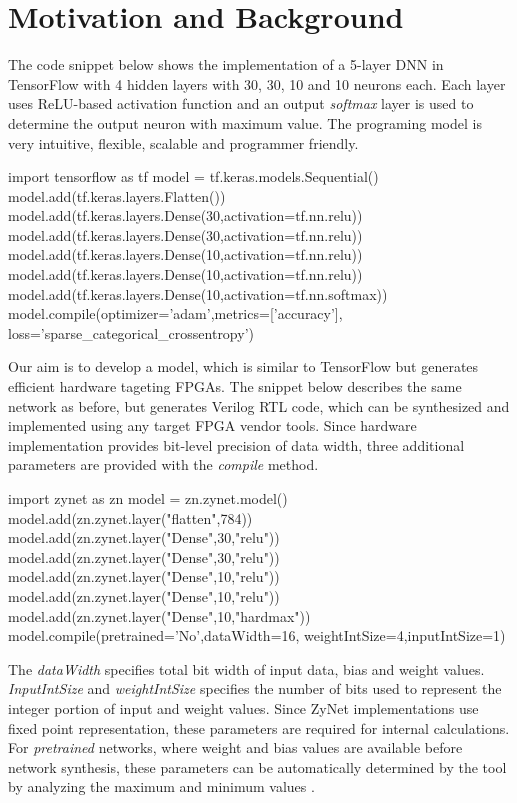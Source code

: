 \section{Motivation and Background}

\cite{xilinxddnk}
The code snippet below shows the implementation of a 5-layer DNN in TensorFlow with 4 hidden layers with 30, 30, 10 and 10 neurons each.
Each layer uses ReLU-based activation function and an output \emph{softmax} layer is used to determine the output neuron with maximum value. 
The programing model is very intuitive, flexible, scalable and programmer friendly. 

\begin{python}
import tensorflow as tf
model = tf.keras.models.Sequential()
model.add(tf.keras.layers.Flatten())
model.add(tf.keras.layers.Dense(30,activation=tf.nn.relu))
model.add(tf.keras.layers.Dense(30,activation=tf.nn.relu))
model.add(tf.keras.layers.Dense(10,activation=tf.nn.relu))
model.add(tf.keras.layers.Dense(10,activation=tf.nn.relu))
model.add(tf.keras.layers.Dense(10,activation=tf.nn.softmax))
model.compile(optimizer='adam',metrics=['accuracy'],
loss='sparse_categorical_crossentropy')
\end{python}

Our aim is to develop a model, which is similar to TensorFlow but generates efficient hardware tageting FPGAs.
The snippet below describes the same network as before, but generates Verilog RTL code, which can be synthesized and implemented using any target FPGA vendor tools.
Since hardware implementation provides bit-level precision of data width, three additional parameters are provided with the \emph{compile} method. 

\begin{python}
import zynet as zn
model = zn.zynet.model()
model.add(zn.zynet.layer("flatten",784))
model.add(zn.zynet.layer("Dense",30,"relu"))
model.add(zn.zynet.layer("Dense",30,"relu"))
model.add(zn.zynet.layer("Dense",10,"relu"))
model.add(zn.zynet.layer("Dense",10,"relu"))
model.add(zn.zynet.layer("Dense",10,"hardmax"))
model.compile(pretrained='No',dataWidth=16,
    weightIntSize=4,inputIntSize=1)
\end{python}

The \emph{dataWidth} specifies total bit width of input data, bias and weight values. \emph{InputIntSize} and \emph{weightIntSize} specifies the number of bits used to represent the integer portion of input and weight values.
Since ZyNet implementations use fixed point representation, these parameters are required for internal calculations.
For \emph{pretrained} networks, where weight and bias values are available before network synthesis, these parameters can be automatically determined by the tool by analyzing the maximum and minimum values .